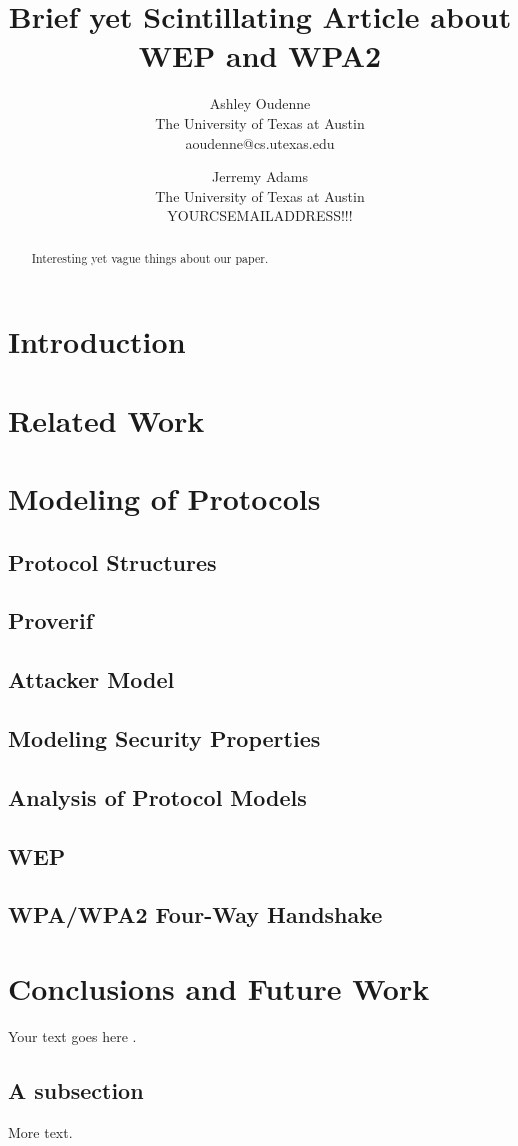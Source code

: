 \documentclass[11pt, twocolumn]{article} %
\title{\textbf{Brief yet Scintillating Article about WEP and WPA2}}
\author{
	Ashley Oudenne\\
	The University of Texas at Austin\\
	aoudenne@cs.utexas.edu\\
	\and
	Jerremy Adams\\
	The University of Texas at Austin\\
	YOURCSEMAILADDRESS!!!
}
\begin{document}
\maketitle
\begin{abstract}
Interesting yet vague things about our paper.
\end{abstract}
\section{Introduction}

\section{Related Work}

\section{Modeling of Protocols}
\subsection{Protocol Structures}
\subsection{Proverif}
\subsection{Attacker Model}
\subsection{Modeling Security Properties}

\subsection{Analysis of Protocol Models}
\subsection{WEP}
\subsection{WPA/WPA2 Four-Way Handshake}

\section{Conclusions and Future Work}

Your text goes here \cite{raju11}.

\subsection{A subsection}

More text.





\end{document}

